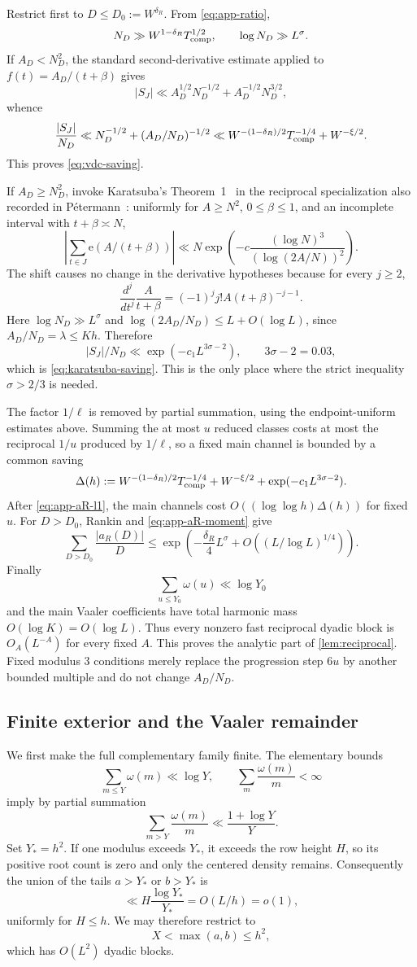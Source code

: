 \documentclass[11pt]{article}
\theoremstyle{definition}
\theoremstyle{remark}
\newcommand{\e}{\mathrm e}
\newcommand{\1}{\mathbf 1}
\newcommand{\om}{\omega}
\begin{document}
Restrict first to $D\le D_0:=W^{\delta_R}$.  From \cref{eq:app-ratio},
\[
N_D\gg W^{1-\delta_R}T_{\rm comp}^{1/2},
\qquad
\log N_D\gg L^\sigma.
\]
If $A_D<N_D^2$, the standard second-derivative estimate applied to
$f(t)=A_D/(t+\beta)$ gives
\[
|S_J|\ll A_D^{1/2}N_D^{-1/2}+A_D^{-1/2}N_D^{3/2},
\]
whence
\[
\frac{|S_J|}{N_D}
\ll N_D^{-1/2}+(A_D/N_D)^{-1/2}
\ll W^{-(1-\delta_R)/2}T_{\rm comp}^{-1/4}+W^{-\xi/2}.
\]
This proves \cref{eq:vdc-saving}.

If $A_D\ge N_D^2$, invoke Karatsuba's Theorem~1~\cite{Karatsuba1971} in the reciprocal specialization also recorded in P\'etermann~\cite{Petermann1998}: uniformly for $A\ge N^2$, $0\le\beta\le1$, and an incomplete interval with $t+\beta\asymp N$,
\begin{equation}\label{eq:app-karatsuba}
\left|\sum_{t\in J}\e(A/(t+\beta))\right|
\ll N\exp\!\left(-c\frac{(\log N)^3}{(\log(2A/N))^2}\right).
\end{equation}
The shift causes no change in the derivative hypotheses because for every $j\ge2$,
\[
\frac{d^j}{dt^j}\frac{A}{t+\beta}
=(-1)^jj!A(t+\beta)^{-j-1}.
\]
Here $\log N_D\gg L^\sigma$ and
$\log(2A_D/N_D)\le L+O(\log L)$, since $A_D/N_D=\lambda\le Kh$.  Therefore
\[
|S_J|/N_D\ll\exp(-c_1L^{3\sigma-2}),
\qquad 3\sigma-2=0.03,
\]
which is \cref{eq:karatsuba-saving}.  This is the only place where the strict inequality $\sigma>2/3$ is needed.

The factor $1/\ell$ is removed by partial summation, using the endpoint-uniform estimates above.  Summing the at most $u$ reduced classes costs at most the reciprocal $1/u$ produced by $1/\ell$, so a fixed main channel is bounded by a common saving
\[
\Delta(h):=W^{-(1-\delta_R)/2}T_{\rm comp}^{-1/4}
+W^{-\xi/2}+\exp(-c_1L^{3\sigma-2}).
\]
After \cref{eq:app-aR-l1}, the main channels cost
$O((\log\log h)\Delta(h))$ for fixed $u$.  For $D>D_0$, Rankin and \cref{eq:app-aR-moment} give
\[
\sum_{D>D_0}\frac{|a_R(D)|}{D}
\le\exp\!\left(-\frac{\delta_R}{4}L^\sigma
+O((L/\log L)^{1/4})\right).
\]
Finally
\[
\sum_{u\le Y_0}\om(u)\ll\log Y_0
\]
and the main Vaaler coefficients have total harmonic mass $O(\log K)=O(\log L)$.  Thus every nonzero fast reciprocal dyadic block is $O_A(L^{-A})$ for every fixed $A$.  This proves the analytic part of \cref{lem:reciprocal}.  Fixed modulus $3$ conditions merely replace the progression step $6u$ by another bounded multiple and do not change $A_D/N_D$.

\subsection{Finite exterior and the Vaaler remainder}
We first make the full complementary family finite.  The elementary bounds
\[
\sum_{m\le Y}\om(m)\ll\log Y,
\qquad
\sum_m\frac{\om(m)}m<\infty
\]
imply by partial summation
\[
\sum_{m>Y}\frac{\om(m)}m\ll\frac{1+\log Y}{Y}.
\]
Set $Y_*=h^2$.  If one modulus exceeds $Y_*$, it exceeds the row height $H$, so its positive root count is zero and only the centered density remains.  Consequently the union of the tails $a>Y_*$ or $b>Y_*$ is
\[
\ll H\frac{\log Y_*}{Y_*}=O(L/h)=o(1),
\]
uniformly for $H\le h$.  We may therefore restrict to
\[
X<\max(a,b)\le h^2,
\]
which has $O(L^2)$ dyadic blocks.
\end{document}

